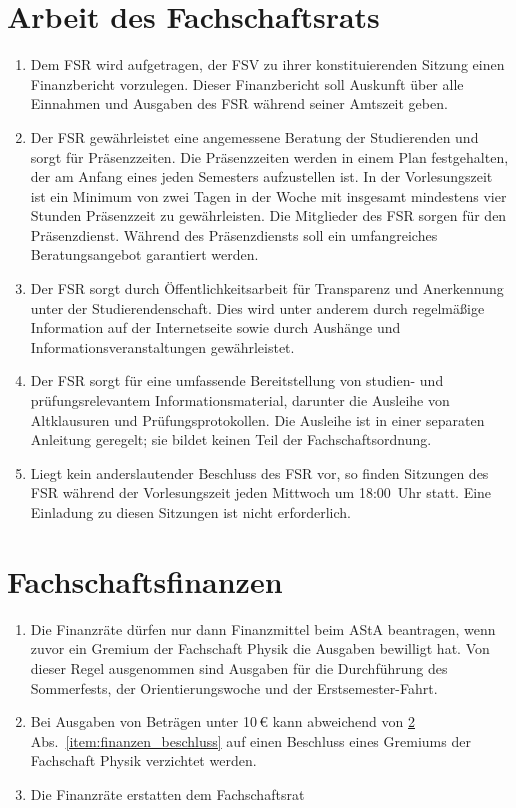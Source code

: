 \section{Arbeit des Fachschaftsrats}
\begin{enumerate}
	\item Dem FSR wird aufgetragen, der FSV zu ihrer konstituierenden Sitzung einen Finanzbericht vorzulegen.
	Dieser Finanzbericht soll Auskunft über alle Einnahmen und Ausgaben des FSR während seiner Amtszeit geben.
	\item Der FSR gewährleistet eine angemessene Beratung der Studierenden und sorgt für Präsenzzeiten.
	Die Präsenzzeiten werden in einem Plan festgehalten, der am Anfang eines jeden Semesters aufzustellen ist.
	In der Vorlesungszeit ist ein Minimum von zwei Tagen in der Woche mit insgesamt mindestens vier Stunden Präsenzzeit zu gewährleisten.
	Die Mitglieder des FSR sorgen für den Präsenzdienst.
	Während des Präsenzdiensts soll ein umfangreiches Beratungsangebot garantiert werden.
	\item Der FSR sorgt durch Öffentlichkeitsarbeit für Transparenz und Anerkennung unter der Studierendenschaft.
	Dies wird unter anderem durch regelmäßige Information auf der Internetseite sowie durch Aushänge und Informationsveranstaltungen gewährleistet.
	\item Der FSR sorgt für eine umfassende Bereitstellung von studien- und prüfungsrelevantem Informationsmaterial, darunter die Ausleihe von Altklausuren und Prüfungsprotokollen.
	Die Ausleihe ist in einer separaten Anleitung geregelt; sie bildet keinen Teil der Fachschaftsordnung.
	\item Liegt kein anderslautender Beschluss des FSR vor, so finden Sitzungen des FSR während der Vorlesungszeit jeden Mittwoch um 18:00~Uhr  statt.
	Eine Einladung zu diesen Sitzungen ist nicht erforderlich.
\end{enumerate}

\section{Fachschaftsfinanzen}
\label{sec:finanzen}
\begin{enumerate}
	\item \label{item:finanzen_beschluss}
Die Finanzräte dürfen nur dann Finanzmittel beim AStA beantragen, wenn zuvor ein Gremium der Fachschaft Physik die Ausgaben bewilligt hat.
	Von dieser Regel ausgenommen sind Ausgaben für die Durchführung des Sommerfests, der Orientierungswoche und der Erstsemester-Fahrt.
	\item Bei Ausgaben von Beträgen unter 10\,€ kann abweichend von \ref{sec:finanzen} Abs.~\ref{item:finanzen_beschluss} auf einen Beschluss eines Gremiums der Fachschaft Physik verzichtet werden.
	\item Die Finanzräte erstatten dem Fachschaftsrat 
\end{enumerate}


